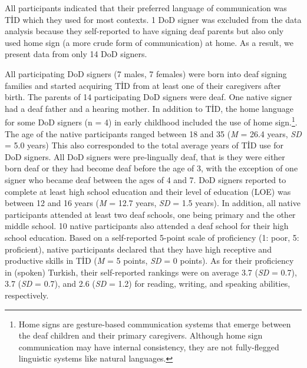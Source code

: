 \documentclass[]{elsarticle} %
\begin{document}
All participants indicated that their preferred language of
communication was TİD which they used for most contexts. 1 DoD signer
was excluded from the data analysis because they self-reported to have
signing deaf parents but also only used home sign (a more crude form of
communication) at home. As a result, we present data from only 14 DoD
signers.

All participating DoD signers (7 males, 7 females) were born into deaf
signing families and started acquiring TİD from at least one of their
caregivers after birth. The parents of 14 participating DoD signers were
deaf. One native signer had a deaf father and a hearing mother. In
addition to TİD, the home language for some DoD signers (n = 4) in early
childhood included the use of home
sign.\footnote{Home signs are gesture-based communication systems that emerge between the deaf children and their primary caregivers. Although home sign communication may have internal consistency, they are not fully-flegged linguistic systems like natural languages.}.
The age of the native participants ranged between 18 and 35 (\emph{M} =
26.4 years, \emph{SD} = 5.0 years) This also corresponded to the total
average years of TİD use for DoD signers. All DoD signers were
pre-lingually deaf, that is they were either born deaf or they had
become deaf before the age of 3, with the exception of one signer who
became deaf between the ages of 4 and 7. DoD signers reported to
complete at least high school education and their level of education
(LOE) was between 12 and 16 years (\emph{M} = 12.7 years, \emph{SD} =
1.5 years). In addition, all native participants attended at least two
deaf schools, one being primary and the other middle school. 10 native
participants also attended a deaf school for their high school
education. Based on a self-reported 5-point scale of proficiency (1:
poor, 5: proficient), native participants declared that they have high
receptive and productive skills in TİD (\emph{M} = 5 points, \emph{SD} =
0 points). As for their proficiency in (spoken) Turkish, their
self-reported rankings were on average 3.7 (\emph{SD} = 0.7), 3.7
(\emph{SD} = 0.7), and 2.6 (\emph{SD} = 1.2) for reading, writing, and
speaking abilities, respectively.
\end{document}
